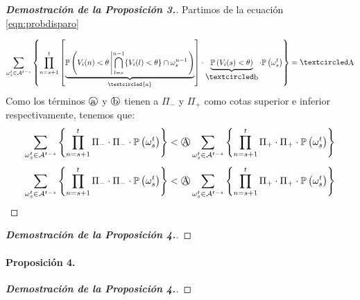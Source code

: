 \begin{proof}[\bf{Demostración de la Proposición 3.}]
Partimos de la ecuación \eqref{eqn:probdisparo}

\begin{equation*}
    \sum_{\omega_s^t \in \mathcal{A}^{t-s}} \left\{ \prod_{n=s+1}^t \left[
       \underbrace{ \prob{ V_i(n) < \theta \left|  \bigcap_{l=s}^{n-1} \{ V_i(l) < \theta \} \cap \omega_s^{n-1} \right.} }_{\textcircled{a}} \right] \cdot  \underbrace{\prob{ V_i(s) < \theta}}_{\textoCircle{b}} \cdot \prob{\omega_s^t} \right\} = \textoCircle{A}
\end{equation*}
Como los términos $\textoCircle{a}$ y $\textoCircle{b}$ tienen a $\Pi_-$ y $\Pi_+$ como cotas superior e inferior respectivamente, tenemos que:
\begin{equation*}
    \sum_{\omega_s^t \in \mathcal{A}^{t-s}} \left\{ \prod_{n=s+1}^t 
       \Pi_-  \cdot  \Pi_- \cdot \prob{\omega_s^t} \right\} 
       < \textoCircle{A}
    \sum_{\omega_s^t \in \mathcal{A}^{t-s}} \left\{ \prod_{n=s+1}^t 
       \Pi_+  \cdot  \Pi_+ \cdot \prob{\omega_s^t} \right\} 
\end{equation*}
\begin{equation*}
    \sum_{\omega_s^t \in \mathcal{A}^{t-s}} \left\{ \prod_{n=s+1}^t 
       \Pi_-  \cdot  \Pi_- \cdot \prob{\omega_s^t} \right\} 
       < \textoCircle{A}
    \sum_{\omega_s^t \in \mathcal{A}^{t-s}} \left\{ \prod_{n=s+1}^t 
       \Pi_+  \cdot  \Pi_+ \cdot \prob{\omega_s^t} \right\} 
\end{equation*}

\end{proof}















\begin{proof}[\bf{Demostración de la Proposición 4.}]
\end{proof}

\paragraph{Proposición 4.}

\begin{proof}[\bf{Demostración de la Proposición 4.}]
\end{proof}


